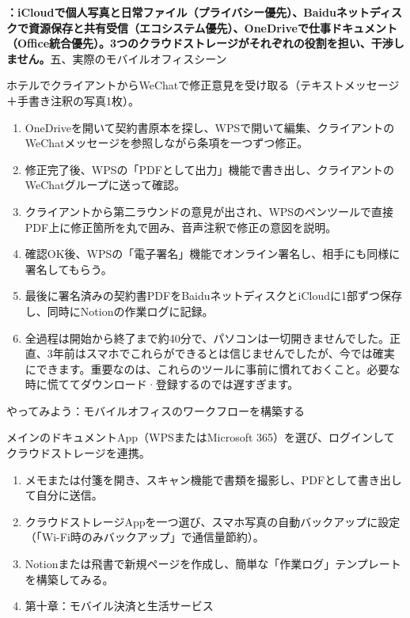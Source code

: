 \textbf{：iCloudで個人写真と日常ファイル（プライバシー優先）、Baiduネットディスクで資源保存と共有受信（エコシステム優先）、OneDriveで仕事ドキュメント（Office統合優先）。3つのクラウドストレージがそれぞれの役割を担い、干渉しません。}五、実際のモバイルオフィスシーン


ホテルでクライアントからWeChatで修正意見を受け取る（テキストメッセージ＋手書き注釈の写真1枚）。

\begin{enumerate}
  \item OneDriveを開いて契約書原本を探し、WPSで開いて編集、クライアントのWeChatメッセージを参照しながら条項を一つずつ修正。
  \item 修正完了後、WPSの「PDFとして出力」機能で書き出し、クライアントのWeChatグループに送って確認。
  \item クライアントから第二ラウンドの意見が出され、WPSのペンツールで直接PDF上に修正箇所を丸で囲み、音声注釈で修正の意図を説明。
  \item 確認OK後、WPSの「電子署名」機能でオンライン署名し、相手にも同様に署名してもらう。
  \item 最後に署名済みの契約書PDFをBaiduネットディスクとiCloudに1部ずつ保存し、同時にNotionの作業ログに記録。
  \item 全過程は開始から終了まで約40分で、パソコンは一切開きませんでした。正直、3年前はスマホでこれらができるとは信じませんでしたが、今では確実にできます。重要なのは、これらのツールに事前に慣れておくこと。必要な時に慌ててダウンロード·登録するのでは遅すぎます。
\end{enumerate}

やってみよう：モバイルオフィスのワークフローを構築する

\begin{tcbpractice}{メインのドキュメントApp（WPSまたはMicrosoft 365）を選び、ログインしてクラウドストレージを連携。}
\begin{enumerate}
  \item メモまたは付箋を開き、スキャン機能で書類を撮影し、PDFとして書き出して自分に送信。
  \item クラウドストレージAppを一つ選び、スマホ写真の自動バックアップに設定（「Wi-Fi時のみバックアップ」で通信量節約）。
  \item Notionまたは飛書で新規ページを作成し、簡単な「作業ログ」テンプレートを構築してみる。
  \item 第十章：モバイル決済と生活サービス
\end{enumerate}

\end{tcbpractice}
